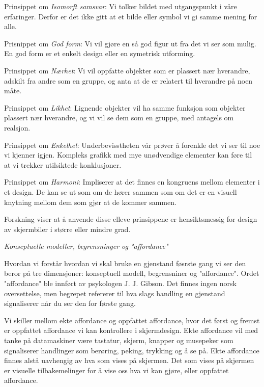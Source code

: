 \noindent
Prinsippet om \emph{Isomorft samsvar}: Vi tolker bildet med utgangspunkt i våre erfaringer. Derfor er det ikke gitt at et bilde eller symbol vi gi samme mening for alle.

\noindent
Prisnippet om \emph{God form}: Vi vil gjøre en så god figur ut fra det vi ser som mulig. En god form er et enkelt design eller en symetrisk utforming.

\noindent
Prinsippet om \emph{Nærhet}: Vi vil oppfatte objekter som er plassert nær hverandre, adskilt fra andre som en gruppe, og anta at de er relatert til hverandre på noen måte.

\noindent
Prinsippet om \emph{Likhet}: Lignende objekter vil ha samme funksjon som objekter plassert nær hverandre, og vi vil se dem som en gruppe, med antagels om realsjon.

\noindent
Prinsippet om \emph{Enkelhet}: Underbevisstheten vår prøver å forenkle det vi ser til noe vi kjenner igjen. Kompleks grafikk med mye unødvendige elementer kan føre til at vi trekker utilsiktede konklusjoner.

\noindent
Prinsippet om \emph{Harmoni}: Impliserer at det finnes en kongruens mellom elementer i et design. De kan se ut som om de hører sammen som om det er en visuell knytning mellom dem som gjør at de kommer sammen.

\noindent
Forskning viser at å anvende disse elleve prinsippene er hensiktsmessig for design av skjermbiler i større eller mindre grad\cite{Chang02}.

\noindent
\emph{Konseptuelle modeller, begrensninger og "affordance"}

\noindent
Hvordan vi forstår hvordan vi skal bruke en gjenstand føsrste gang vi ser den beror på tre dimensjoner: konseptuell modell, begrensniner og "affordance". Ordet "affordance" ble innført av psykologen J. J. Gibson. Det finnes ingen norsk oversettelse, men begrepet refererer til hva slags handling en gjenstand signaliserer når du ser den for første gang.\cite{Norman99}

\noindent
Vi skiller mellom ekte affordance og oppfattet affordance, hvor det først og fremst er oppfattet affordance vi kan kontrollere i skjermdesign. Ekte affordance vil med tanke på datamaskiner være tastatur, skjerm, knapper og musepeker som signaliserer handlinger som berøring, peking, trykking og å se på. Ekte affordance finnes alstå uavhengig av hva som vises på skjermen. Det som vises på skjermen er visuelle tilbakemelinger for å vise oss hva vi kan gjøre, eller oppfattet affordance.\cite{Norman99}

